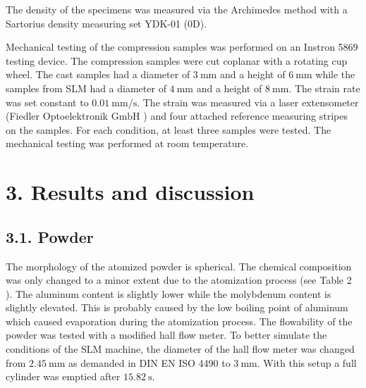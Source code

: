 \documentclass[10pt]{article}
\begin{document}
The density of the specimens was measured via the Archimedes method with a Sartorius density measuring set YDK-01 (0D).

Mechanical testing of the compression samples was performed on an Instron 5869 testing device. The compression samples were cut coplanar with a rotating cup wheel. The cast samples had a diameter of $3 \mathrm{~mm}$ and a height of $6 \mathrm{~mm}$ while the samples from SLM had a diameter of $4 \mathrm{~mm}$ and a height of $8 \mathrm{~mm}$. The strain rate was set constant to $0.01 \mathrm{~mm} / \mathrm{s}$. The strain was measured via a laser extensometer (Fiedler Optoelektronik $\mathrm{GmbH}$ ) and four attached reference measuring stripes on the samples. For each condition, at least three samples were tested. The mechanical testing was performed at room temperature.

\section*{3. Results and discussion}
\subsection*{3.1. Powder}
The morphology of the atomized powder is spherical. The chemical composition was only changed to a minor extent due to the atomization process (see Table 2 ). The aluminum content is slightly lower while the molybdenum content is slightly elevated. This is probably caused by the low boiling point of aluminum which caused evaporation during the atomization process. The flowability of the powder was tested with a modified hall flow meter. To better simulate the conditions of the SLM machine, the diameter of the hall flow meter was changed from $2.45 \mathrm{~mm}$ as demanded in DIN EN ISO 4490 to $3 \mathrm{~mm}$. With this setup a full cylinder was emptied after $15.82 \mathrm{~s}$.
\end{document}
